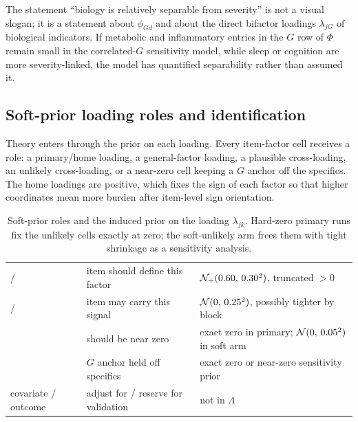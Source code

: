 \begin{keyresult}
The statement ``biology is relatively separable from severity'' is not a visual slogan; it is a statement about
$\phi_{Gd}$ and about the direct bifactor loadings $\lambda_{jG}$ of biological indicators. If metabolic and
inflammatory entries in the $G$ row of $\Phi$ remain small in the correlated-$G$ sensitivity model, while sleep
or cognition are more severity-linked, the model has quantified separability rather than assumed it.
\end{keyresult}

\subsection{Soft-prior loading roles and identification}
\label{sub:roles}
\label{sub:identification}
Theory enters through the prior on each loading. Every item-factor cell receives a role: a primary/home loading,
a general-factor loading, a plausible cross-loading, an unlikely cross-loading, or a near-zero cell keeping a
$G$ anchor off the specifics. The home loadings are positive, which fixes the sign of each factor so that higher
coordinates mean more burden after item-level sign orientation.

\begin{table}[h]\centering\small\sffamily
\caption{Soft-prior roles and the induced prior on the loading $\lambda_{jk}$. Hard-zero primary runs fix the
unlikely cells exactly at zero; the soft-unlikely arm frees them with tight shrinkage as a sensitivity analysis.}
\label{tab:priorroles}
\begin{tabular}{L{4.6cm} L{5.0cm} L{4.4cm}}
\toprule
{} &  & \\
\midrule
{}  /  & item should define this factor & $\mathcal{N}_{+}(0.60,\,0.30^2)$, truncated $>0$\\
 /  & item may carry this signal & $\mathcal{N}(0,\,0.25^2)$, possibly tighter by block\\
  & should be near zero & exact zero in primary; $\mathcal{N}(0,\,0.05^2)$ in soft arm\\
 & $G$ anchor held off specifics & exact zero or near-zero sensitivity prior\\
covariate / outcome & adjust for / reserve for validation & not in $\Lambda$\\
\bottomrule
\end{tabular}
\end{table}

